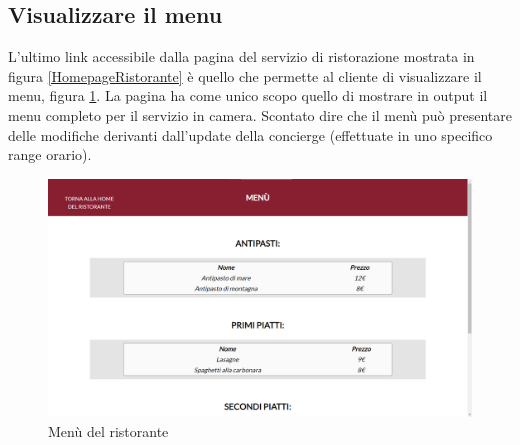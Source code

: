\documentclass [a4paper, 12pt]{book}
\begin{document}
\subsection{Visualizzare il menu}
L'ultimo link accessibile dalla pagina del servizio di ristorazione mostrata in figura \ref{HomepageRistorante} è quello che permette al cliente di visualizzare il menu, figura \ref{MenuCliente}. La pagina ha come unico scopo quello di mostrare in output il menu completo per il servizio in camera. Scontato dire che il menù può presentare delle modifiche derivanti dall'update della concierge (effettuate in uno specifico range orario).
\begin{figure}[!h]
\centering
\includegraphics[scale=0.26]{MenuCliente.png}
\caption{Menù del ristorante}
\label{MenuCliente}
\end{figure}
\end{document}
